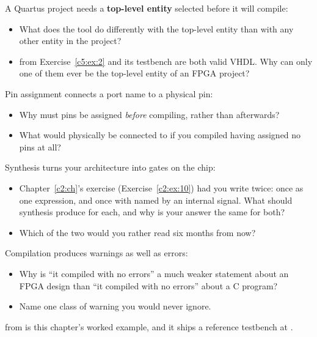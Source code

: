 \begin{parts}
  \item A Quartus project needs a \textbf{top-level entity} selected before it will compile:
    \begin{itemize}
      \item What does the tool do differently with the top-level entity than with any other entity
        in the project?
      \item {} from Exercise~\ref{c5:ex:2} and its testbench are both valid VHDL.
        Why can only one of them ever be the top-level entity of an FPGA project?
    \end{itemize}
  \item Pin assignment connects a port name to a physical pin:
    \begin{itemize}
      \item Why must pins be assigned \emph{before} compiling, rather than afterwards?
      \item What would  physically be connected to if you compiled  having
        assigned no pins at all?
    \end{itemize}
  \item Synthesis turns your architecture into gates on the chip:
    \begin{itemize}
      \item Chapter~\ref{c2:ch}'s  exercise (Exercise~\ref{c2:ex:10}) had you
        write  twice: once as one expression, and once with  named by
        an internal signal. What should synthesis produce for each, and why is your answer the same
        for both?
      \item Which of the two would you rather read six months from now?
    \end{itemize}
  \item Compilation produces warnings as well as errors:
    \begin{itemize}
      \item Why is ``it compiled with no errors'' a much weaker statement about an FPGA design than
        ``it compiled with no errors'' about a C program?
      \item Name one class of warning you would never ignore.
    \end{itemize}
\end{parts}

\label{c5:ex:6}
 from  is this chapter's worked example, and it ships a reference
testbench at .

